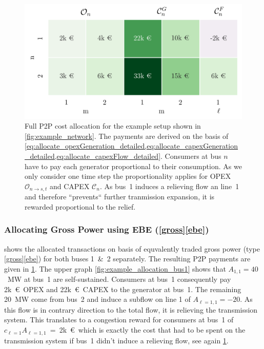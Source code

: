 \documentclass[11pt,twocolumn]{article}
\newcommand{\allocateopex}[1][n \rightarrow s]{\mathcal{O}_{#1,t}}
\begin{document}
% 
% 
% 
\begin{figure}[h]
\centering
\includegraphics[width=\linewidth]{example_payoff.png}
\caption{Full P2P cost allocation for the example setup shown in \cref{fig:example_network}. The payments are derived on the basis of \cref{eq:allocate_opexGeneration_detailed,eq:allocate_capexGeneration_detailed,eq:allocate_capexFlow_detailed}. Consumers at bus $n$ have to pay each generator proportional to their consumption. As we only consider one time step the proportionality applies for OPEX $\allocateopex$ and CAPEX $\mathcal{C}_n$. As bus~1 induces a relieving flow an line~1 and therefore ``prevents`` further tranmission expansion, it is rewarded proportional to the relief.}
\label{fig:example_payoff}
\end{figure}
% 
% 
\subsubsection*{Allocating Gross Power using EBE (\ref{gross}\ref{ebe}) }

 shows the allocated transactions on basis of equvalently traded gross power (type \ref{gross}\ref{ebe}) for both buses 1~\&~2 separately. The resulting P2P payments are given in \cref{fig:example_payoff}.
The upper graph \cref{fig:example_allocation_bus1} shows that $A_{1,1}=40$~MW at bus~1 are self-sustained. Consumers at bus~1 consequently pay 2k~\euro~OPEX and 22k~\euro~CAPEX to the generator at bus~1. The remaining 20~MW come from bus~2 and induce a subflow on line 1 of $A_{\ell = 1, 1} = -20$. As this flow is in contrary direction to the total flow, it is relieving the transmission system. This translates to a congestion reward for consumers at bus~1 of $c_{\ell=1} A_{\ell = 1, 1}$~=~2k~\euro\, which is exactly the cost that had to be spent on the transmission system if bus~1 didn't induce a relieving flow, see again \cref{fig:example_payoff}. 
\end{document}
